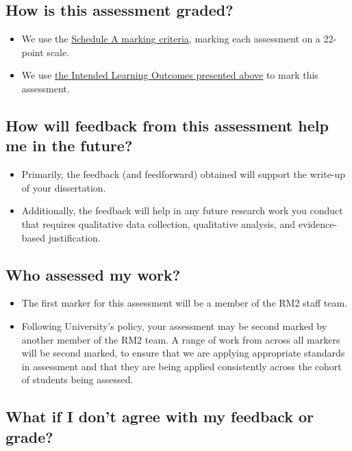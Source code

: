 \documentclass[
  english,
  letterpaper,
  DIV=11,
  numbers=noendperiod]{scrreprt}
\begin{document}
\subsection{How is this assessment
graded?}\label{how-is-this-assessment-graded-3}

\begin{itemize}
\item
  We use the
  \href{https://www.gla.ac.uk/media/Media_1200302_smxx.pdf}{Schedule A
  marking criteria}, marking each assessment on a 22-point scale.
\item
  We use \hyperref[report_ILOs]{the Intended Learning Outcomes presented
  above} to mark this assessment.
\end{itemize}

\subsection{How will feedback from this assessment help me in the
future?}\label{how-will-feedback-from-this-assessment-help-me-in-the-future-2}

\begin{itemize}
\item
  Primarily, the feedback (and feedforward) obtained will support the
  write-up of your dissertation.
\item
  Additionally, the feedback will help in any future research work you
  conduct that requires qualitative data collection, qualitative
  analysis, and evidence-based justification.
\end{itemize}

\subsection{Who assessed my work?}\label{who-assessed-my-work-3}

\begin{itemize}
\item
  The first marker for this assessment will be a member of the RM2 staff
  team.
\item
  Following University's policy, your assessment may be second marked by
  another member of the RM2 team. A range of work from across all
  markers will be second marked, to ensure that we are applying
  appropriate standards in assessment and that they are being applied
  consistently across the cohort of students being assessed.
\end{itemize}

\subsection{What if I don't agree with my feedback or
grade?}\label{what-if-i-dont-agree-with-my-feedback-or-grade-2}
\end{document}
